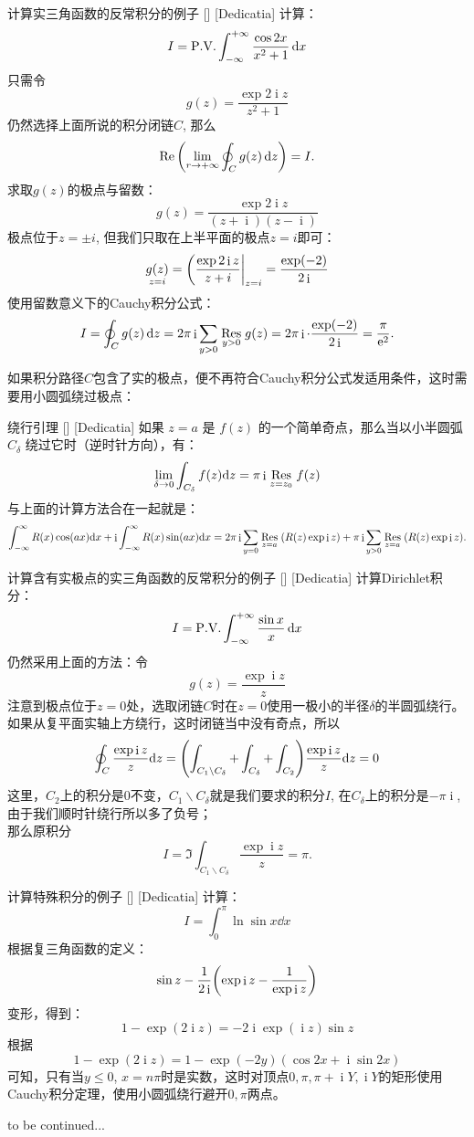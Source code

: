\documentclass[UTF8]{ctexart}
\newcommand{\continued}{{\Large to be continued...}}
\DeclareMathOperator{\ii}{\mathrm{i}}
\DeclareMathOperator{\ee}{\mathrm{e}}
\begin{document}
\begin{xmp}
    [UUID]
    {计算实三角函数的反常积分的例子}
    []
    [Dedicatia]
    计算：
    \[I=\PV\int_{-\infty}^{+\infty}\frac{\cos 2x}{x^2+1}\dd{x}\]
    只需令
    \[g(z)=\frac{\exp 2\ii z}{z^2+1}\]
    仍然选择上面所说的积分闭链$C$, 那么
    \[\Re\qty(\lim_{r\to +\infty}\oint_C g(z)\dd{z})=I.\]
    求取$g(z)$的极点与留数：
    \[g(z)=\frac{\exp 2\ii z}{(z+\ii)(z-\ii)}\]
    极点位于$z=\pm i$, 但我们只取在上半平面的极点$z=i$即可：
    \[\underset{z=i}{g(z)}=\eval(\frac{\exp 2\ii z}{z+i}|_{z=i}=\frac{\exp(-2)}{2\ii}\]
    使用留数意义下的Cauchy积分公式：
    \[I=\oint_C g(z)\dd{z}=2\pi\ii\sum_{y>0}\underset{y>0}{\Res}g(z)=2\pi\ii\cdot\frac{\exp(-2)}{2\ii}=\frac{\pi}{\ee^2}.\]
\end{xmp}
如果积分路径$C$包含了实的极点，便不再符合Cauchy积分公式发适用条件，这时需要用小圆弧绕过极点：
\begin{lma}
    [UUID]
    {绕行引理}
    []
    [Dedicatia]
    如果 $z=a$ 是 $f(z)$ 的一个简单奇点，那么当以小半圆弧 $C_\delta$ 绕过它时（逆时针方向），有：
    $$\lim_{\delta \to 0} \int_{C_\delta} f(z) \dd z = \pi \ii \underset{z=z_0}{\Res}f(z)$$
    与上面的计算方法合在一起就是：
    \[\int_{-\infty}^{\infty} R(x) \cos(ax) \dd x +\ii\int_{-\infty}^{\infty} R(x) \sin(ax) \dd x =2\pi\ii\sum_{y=0}\underset{z=a}{\Res}(R(z)\exp\ii z)+\pi\ii\sum_{y>0}\underset{z=a}{\Res}(R(z)\exp\ii z).\]
\end{lma}
\begin{xmp}
    [UUID]
    {计算含有实极点的实三角函数的反常积分的例子}
    []
    [Dedicatia]
    计算Dirichlet积分：
    \[I=\PV\int_{-\infty}^{+\infty}\frac{\sin x}{x}\dd{x}\]
    仍然采用上面的方法：令
    \[g(z)=\frac{\exp\ii z}{z}\]
    注意到极点位于$z=0$处，选取闭链$C$时在$z=0$使用一极小的半径$\delta$的半圆弧绕行。如果从复平面实轴上方绕行，这时闭链当中没有奇点，所以
    $$\oint_C \frac{\exp \ii z}{z} \dd z =\qty(\int_{C_1\backslash C_\delta}+\int_{C_\delta}+\int_{C_2})\frac{\exp \ii z}{z} \dd z = 0$$
    这里，$C_2$上的积分是0不变，$C_1\backslash C_\delta$就是我们要求的积分$I$, 在$C_\delta$上的积分是$-\pi\ii$, 由于我们顺时针绕行所以多了负号；\\
    那么原积分
    \[I=\Im\int_{C_1\backslash C_\delta}\frac{\exp\ii z}{z}=\pi.\]
\end{xmp}
\begin{xmp}
    [UUID]
    {计算特殊积分的例子}
    []
    [Dedicatia]
    计算：
    \[I=\int_0^\pi \ln\sin x\dd{x}\]
    根据复三角函数的定义：
    \[\sin z-\frac{1}{2\ii}\qty(\exp\ii z-\frac{1}{\exp\ii z})\]
    变形，得到：
    \[1-\exp(2\ii z)=-2\ii\exp(\ii z)\sin z\]
    根据
    \[1-\exp(2\ii z)=1-\exp(-2y)(\cos 2x+\ii\sin 2x)\]
    可知，只有当$y\leq 0$, $x=n\pi$时是实数，这时对顶点$0, \pi, \pi+\ii Y, \ii Y$的矩形使用Cauchy积分定理，使用小圆弧绕行避开$0, \pi$两点。
\end{xmp}
\continued
\end{document}
